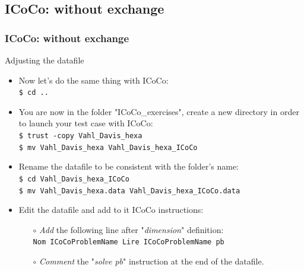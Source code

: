 \documentclass[10pt, hyperref={unicode=true,pdfusetitle, bookmarks=true,bookmarksnumbered=false,bookmarksopen=false, breaklinks=false,pdfborder={0 0 1},backref=true,colorlinks=true,linkcolor=darkblue,pageanchor, urlcolor=darkblue}]{beamer}
\begin{document}
\subsection{{\bf{ICoCo: without exchange}}}
\begin{frame}
\frametitle{ICoCo: without exchange}

\begin{block}{Adjusting the datafile}
\begin{itemize}
\item Now let's do the same thing with ICoCo:\\
\texttt{\$ cd ..}\\
\item You are now in the folder "ICoCo\_exercises", create a new directory in order to launch your test case with ICoCo:\\
\texttt{\$ trust -copy Vahl\_Davis\_hexa}\\
\texttt{\$ mv Vahl\_Davis\_hexa Vahl\_Davis\_hexa\_ICoCo}\\
\item Rename the datafile to be consistent with the folder's name:\\
\texttt{\$ cd Vahl\_Davis\_hexa\_ICoCo}\\
\texttt{\$ mv Vahl\_Davis\_hexa.data Vahl\_Davis\_hexa\_ICoCo.data}\\
\item Edit the datafile and add to it ICoCo instructions:
    \begin{itemize}
    \item [$\circ$] \textit{Add} the following line after "\textit{dimension}" definition:\\
    \texttt{Nom ICoCoProblemName Lire ICoCoProblemName pb}
    \item [$\circ$] \textit{Comment} the "\textit{solve pb}" instruction at the end of the datafile.
    \end{itemize}
\end{itemize}
\end{block}

\end{frame}
\end{document}

